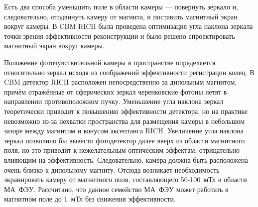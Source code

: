 
Есть два способа уменьшить поле в области камеры --- повернуть зеркало и, следовательно, отодвинуть камеру от магнита, и поставить магнитный экран вокруг камеры. В CBM RICH была проведена оптимизация угла наклона зеркала точки зрения эффективности реконструкции и было решено спроектировать магнитный экран вокруг камеры.



Положение фоточувствительной камеры в пространстве определяется относительно зеркал исходя из соображений эффективности регистрации колец. В CBM детектор RICH расположен непосредственно за дипольным магнитом, причём отражённые от сферических зеркал черенковские фотоны летят в направлении противоположном пучку. Уменьшение угла наклона зеркал теоретически приводит к повышению эффективности детектора, но на практике невозможно из-за нехватки пространства для размещения камеры в небольшом зазоре между магнитом и конусом аксептанса RICH. Увеличение угла наклона зеркал позволило бы вывести фотодетектор далее вверх из области магнитного поля, но это приводит к нежелательным оптическим эффектам, отрицательно влияющим на эффективность. Следовательно, камера должна быть расположена очень близко к дипольному магниту. Отсюда возникает необходимость экранировать камеру от магнитного поля, составляющего 50-100~мТл в области МА~ФЭУ. Рассчитано, что данное семейство МА~ФЭУ может работать в магнитном поле до 1~мТл без снижения эффективности.

